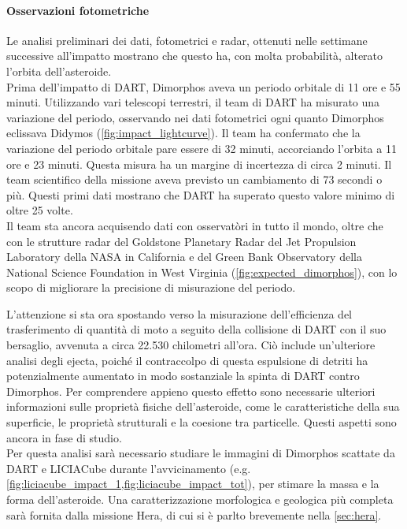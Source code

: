 \documentclass[a4paper,11pt,openright]{book}
\begin{document}
\paragraph*{Osservazioni fotometriche}
Le analisi preliminari dei dati, fotometrici e radar, ottenuti nelle settimane successive all'impatto mostrano che questo ha, con molta probabilità, alterato l'orbita dell'asteroide.\\
Prima dell'impatto di DART, Dimorphos aveva un periodo orbitale di 11 ore e 55 minuti. Utilizzando vari telescopi terrestri, il team di DART ha misurato una variazione del periodo, osservando nei dati fotometrici ogni quanto Dimorphos eclissava Didymos (\cref{fig:impact_lightcurve}). Il team ha confermato che la variazione del periodo orbitale pare essere di 32 minuti, accorciando l'orbita a 11 ore e 23 minuti. Questa misura ha un margine di incertezza di circa 2 minuti. 
Il team scientifico della missione aveva previsto un cambiamento di 73 secondi o più. Questi primi dati mostrano che DART ha superato questo valore minimo di oltre 25 volte. \\

Il team sta ancora acquisendo dati con osservatòri in tutto il mondo, oltre che con le strutture radar del Goldstone Planetary Radar del Jet Propulsion Laboratory della NASA in California e del Green Bank Observatory della National Science Foundation in West Virginia (\cref{fig:expected_dimorphos}), con lo scopo di migliorare la precisione di misurazione del periodo.

L'attenzione si sta ora spostando verso la misurazione dell'efficienza del trasferimento di quantità di moto a seguito della collisione di DART con il suo bersaglio, avvenuta a circa 22.530 chilometri all'ora. Ciò include un'ulteriore analisi degli ejecta, poiché il contraccolpo di questa espulsione di detriti ha potenzialmente aumentato in modo sostanziale la spinta di DART contro Dimorphos. %
Per comprendere appieno questo effetto sono necessarie ulteriori informazioni sulle proprietà fisiche dell'asteroide, come le caratteristiche della sua superficie, le proprietà strutturali e la coesione tra particelle. Questi aspetti sono ancora in fase di studio.\\
Per questa analisi sarà necessario studiare le immagini di Dimorphos scattate da DART e LICIACube durante l'avvicinamento (e.g. \cref{fig:liciacube_impact_1,fig:liciacube_impact_tot}), per stimare la massa e la forma dell'asteroide. Una caratterizzazione morfologica e geologica più completa sarà fornita dalla missione Hera, di cui si è parlto brevemente nella \cref{sec:hera}.
\end{document}
